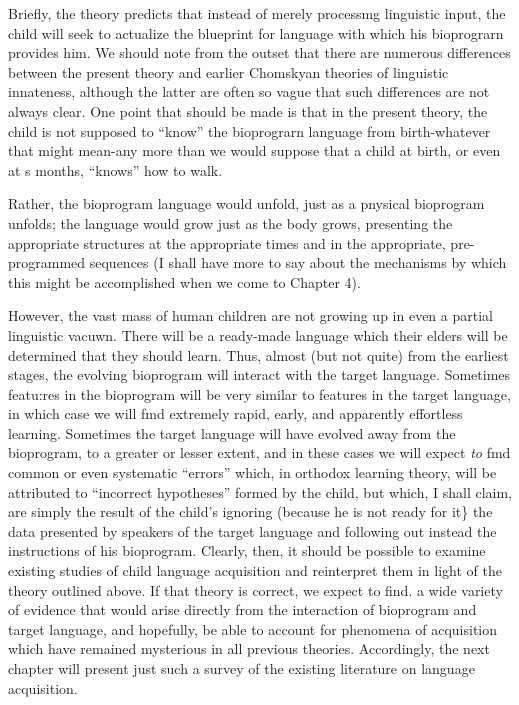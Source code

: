 Briefly, the theory predicts that instead of merely processmg
linguistic input, the child will seek to actualize the blueprint for lan\-guage with which his bioprograrn provides him. We should note from the outset that there are numerous differences between the present theory and earlier Chomskyan theories of linguistic innateness, al\-though the latter are often so vague that such differences are not always clear. One point that should be made is that in the present theory, the child is not supposed to ``know'' the bioprograrn language from birth-whatever that might mean-any more than we would suppose that a child at birth, or even at s months, ``knows'' how to walk.


Rather, the bioprogram language would unfold, just as a pnysical bioprogram unfolds; the language would grow just as the body grows, presenting the appropriate structures at the appropriate times and in the appropriate, pre-programmed sequences (I shall have more to say about the mechanisms by which this might be accomplished when we come to Chapter 4).

However, the vast mass of human children are not growing up in even a partial linguistic vacuwn. There will be a ready-made language which their elders will be determined that they should learn. Thus, almost (but not quite) from the earliest stages, the evolving bioprogram will interact with the target language. Sometimes featu:res in the bio\-program will be very similar to features in the target language, in which case we will fmd extremely rapid, early, and apparently effortless learning. Sometimes the target language will have evolved away from the bioprogram, to a greater or lesser extent, and in these cases we will expect \textit{to} fmd common or even systematic ``errors'' which, in orthodox learning theory, will be attributed to ``incorrect hypotheses'' formed by the child, but which, I shall claim, are simply the result of the child's ignoring (because he is not ready for it\} the data presented by speakers of the target language and following out instead the instruc\-tions of his bioprogram.
Clearly, then, it should be possible to examine existing studies of child language acquisition and reinterpret them in light of the theory outlined above. If that theory is correct, we expect to find. a wide variety of evidence that would arise directly from the interaction of bioprogram and target language, and hopefully, be able to account for phenomena of acquisition which have remained mysterious in all previous theories. Accordingly, the next chapter will present just such a survey of the existing literature on language acquisition.